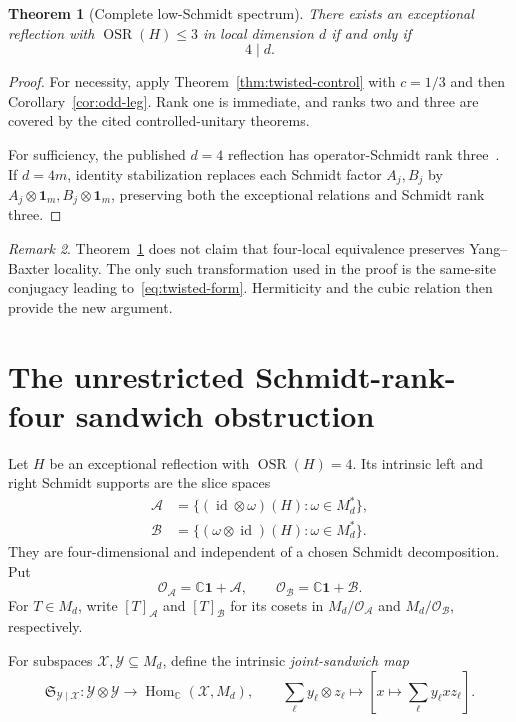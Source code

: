 \documentclass[11pt]{article}
\newtheorem{theorem}{Theorem}[section]
\theoremstyle{definition}
\theoremstyle{remark}
\newtheorem{remark}[theorem]{Remark}
\newcommand{\Id}{\mathbf 1}
\newcommand{\OSR}{\operatorname{OSR}}
\newcommand{\bbC}{\mathbb C}
\newcommand{\cA}{\mathcal A}
\newcommand{\cB}{\mathcal B}
\newcommand{\cX}{\mathcal X}
\newcommand{\cY}{\mathcal Y}
\newcommand{\cO}{\mathcal O}
\newcommand{\cS}{\mathfrak S}
\begin{document}
\begin{theorem}[Complete low-Schmidt spectrum]\label{thm:low-osr}
There exists an exceptional reflection with \(\OSR(H)\le3\) in local
dimension \(d\) if and only if
\[
  \boxed{4\mid d.}
\]
\end{theorem}

\begin{proof}
For necessity, apply Theorem~\ref{thm:twisted-control} with \(c=1/3\)
and then Corollary~\ref{cor:odd-leg}. Rank one is immediate, and ranks
two and three are covered by the cited controlled-unitary theorems.

For sufficiency, the published \(d=4\) reflection has
operator-Schmidt rank three~\cite{Kriebel2026d4}. If \(d=4m\), identity
stabilization replaces each Schmidt factor \(A_j,B_j\) by
\(A_j\otimes\Id_m,B_j\otimes\Id_m\), preserving both the exceptional
relations and Schmidt rank three.
\end{proof}

\begin{remark}
Theorem~\ref{thm:low-osr} does not claim that four-local equivalence
preserves Yang--Baxter locality. The only such transformation used in the
proof is the same-site conjugacy leading to~\eqref{eq:twisted-form}.
Hermiticity and the cubic relation then provide the new argument.
\end{remark}

\section{The unrestricted Schmidt-rank-four sandwich obstruction}
\label{sec:osr4}

Let \(H\) be an exceptional reflection with \(\OSR(H)=4\). Its intrinsic
left and right Schmidt supports are the slice spaces
\[
\begin{split}
 \cA&=\{(\operatorname{id}\otimes\omega)(H):
                  \omega\in M_d^*\},\\
 \cB&=\{(\omega\otimes\operatorname{id})(H):
                  \omega\in M_d^*\}.
\end{split}
\]
They are four-dimensional and independent of a chosen Schmidt
decomposition. Put
\[
  \cO_{\cA}=\bbC\Id+\cA,\qquad
  \cO_{\cB}=\bbC\Id+\cB.
\]
For \(T\in M_d\), write \([T]_{\cA}\) and \([T]_{\cB}\) for its
cosets in \(M_d/\cO_{\cA}\) and \(M_d/\cO_{\cB}\), respectively.

For subspaces \(\cX,\cY\subseteq M_d\), define the intrinsic
\emph{joint-sandwich map}
\begin{equation}
 \cS_{\cY\mid\cX}:
 \cY\otimes\cY\longrightarrow\operatorname{Hom}_{\bbC}(\cX,M_d),
 \qquad
 \sum_\ell y_\ell\otimes z_\ell
 \longmapsto
 \left[x\mapsto\sum_\ell y_\ell xz_\ell\right].
 \label{eq:sandwich-map}
\end{equation}
\end{document}
